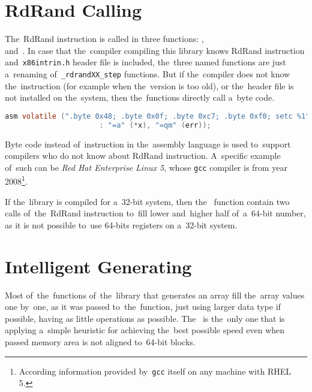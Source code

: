 \section{RdRand Calling}
\par{
The~RdRand instruction is called in three functions: ,  \\and~. In case that the~compiler compiling this library knows RdRand instruction and~{\tt x86intrin.h} header file is included, the~three named functions are just a~renaming of~{\tt \_rdrandXX\_step} functions. But if the~compiler does not know the~instruction (for example when the~version is too old), or the~header file is not installed on the~system, then the~functions directly call a~byte code.
}
\begin{lstlisting}[frame=none, basicstyle=\footnotesize\ttfamily, language=C, numbers=none, numberstyle=\tiny\color{black},caption= {Byte code called in {\tt rdrand64\_step}.}]
 asm volatile (".byte 0x48; .byte 0x0f; .byte 0xc7; .byte 0xf0; setc %1"
                      : "=a" (*x), "=qm" (err));
\end{lstlisting}

\par{
Byte code instead of~instruction in the~assembly language is used to~support compilers who do not know about RdRand instruction. A~specific example of~such can be {\em Red Hat Enterprise Linux 5}, whose {\tt gcc} compiler is from year 2008\footnote{According information provided by~{\tt gcc} itself on any machine with RHEL 5.}. 
}

\par{
If the~library is compiled for a~32-bit system, then the~ function contain two calls of~the~RdRand instruction to~fill lower and~higher half of~a~64-bit number, as it is not possible to~use 64-bits registers on a~32-bit system. 
}
\section{Intelligent Generating}
\par{
Most of~the~functions of~the~library that generates an array fill the~array values one by~one, as it was passed to~the~function, just using larger data type if possible, having as little operations as possible. The~ is the~only one that is applying a~simple heuristic for achieving the~best possible speed even when passed memory area is not aligned to~64-bit blocks.
}

